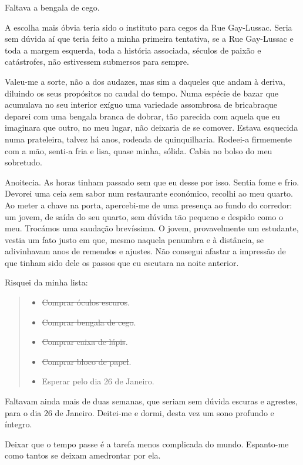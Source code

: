 Faltava a bengala de cego.

A escolha mais óbvia teria sido o instituto para cegos da Rue
Gay-Lussac. Seria sem dúvida aí que teria feito a minha primeira
tentativa, se a Rue Gay-Lussac e toda a margem esquerda, toda a história
associada, séculos de paixão e catástrofes, não estivessem submersos
para sempre.

Valeu-me a sorte, não a dos audazes, mas sim a daqueles que andam à
deriva, diluindo os seus propósitos no caudal do tempo. Numa espécie de
bazar que acumulava no seu interior exíguo uma variedade assombrosa de
bricabraque deparei com uma bengala branca de dobrar, tão parecida com
aquela
que eu imaginara que outro, no meu lugar, não deixaria de se comover.
Estava esquecida numa prateleira, talvez há anos, rodeada de
quinquilharia. Rodeei-a firmemente com a mão, senti-a fria e lisa, quase
minha, sólida. Cabia no bolso do meu sobretudo.

Anoitecia. As horas tinham passado sem que eu desse por isso. Sentia
fome e frio. Devorei uma ceia sem sabor num restaurante económico,
recolhi ao meu quarto. Ao meter a chave na porta, apercebi-me de uma
presença ao fundo do corredor: um jovem, de saída do seu quarto, sem
dúvida tão pequeno e despido como o meu. Trocámos uma saudação
brevíssima. O jovem, provavelmente um estudante, vestia um fato justo em
que, mesmo naquela penumbra e à distância, se adivinhavam anos de
remendos e ajustes. Não consegui afastar a impressão de que tinham sido
dele os passos que eu escutara na noite anterior.

Risquei da minha lista:

\begin{quote}
\begin{itemize}
\item{}\sout{Comprar óculos escuros}.
\item{}\sout{Comprar bengala de cego}.
\item{}\sout{Comprar caixa de lápis}.
\item{}\sout{Comprar bloco de papel}.
\item{}Esperar pelo dia 26 de Janeiro.
\end{itemize}
\end{quote}

Faltavam ainda mais de duas semanas, que seriam sem dúvida escuras e
agrestes, para o dia 26 de Janeiro. Deitei-me e dormi, desta vez um sono
profundo e íntegro.

Deixar que o tempo passe é a tarefa menos complicada do mundo.
Espanto-me como tantos se deixam amedrontar por ela.

